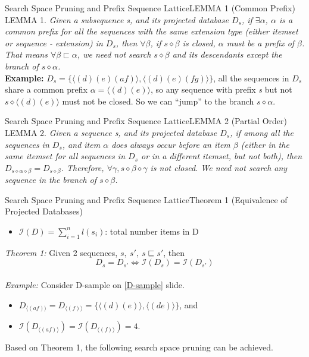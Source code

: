 \documentclass[12pt]{beamer}
\begin{document}
\begin{frame}{Search Space Pruning and Prefix Sequence Lattice}{LEMMA 1 (Common Prefix)}
LEMMA 1. {\it Given a subsequence s, and its projected database $D_s$, if $\exists\alpha$, $\alpha$ is a common prefix for all the sequences with the same extension type (either itemset or sequence - extension) in $D_s$, then $\forall\beta$, if $s \diamond \beta$ is closed, $\alpha$ must be a prefix of $\beta$. That means $\forall\beta \sqsubset \alpha$, we need not search $s \diamond \beta$ and its descendants except the branch of $s \diamond \alpha$.}\\
{\bf Example:} $D_s = \{ \langle (d)(e)(af) \rangle, \langle (d)(e)(fg) \rangle \}$, all the sequences in $D_s$ share a common prefix $\alpha = \langle (d)(e) \rangle$, so any sequence with prefix {\it s} but not $s \diamond \langle (d)(e) \rangle$ must not be closed. So we can ``jump'' to the branch $s \diamond \alpha$.
\end{frame}

\begin{frame}{Search Space Pruning and Prefix Sequence Lattice}{LEMMA 2 (Partial Order)}
LEMMA 2. {\it Given a sequence s, and its projected database $D_s$, if among all the sequences in $D_s$, and item $\alpha$ does always occur before an item $\beta$ (either in the same itemset for all sequences in $D_s$ or in a different itemset, but not both), then $D_{s\diamond\alpha\diamond\beta} = D_{s\diamond\beta}$. Therefore, $\forall\gamma,s\diamond\beta\diamond\gamma$ is not closed. We need not search any sequence in the branch of $s \diamond \beta$.}\\
\end{frame}

\begin{frame}{Search Space Pruning and Prefix Sequence Lattice}{Theorem 1 (Equivalence of Projected Databases)}
\begin{itemize}
	\item $\mathcal{I}(D) = \sum\limits_{i=1}^n l(s_i)$: total number items in D
\end{itemize}
{\it Theorem 1:} Given 2 sequences, $s,~s',~s \sqsubseteq s'$, then $$D_s = D_{s'} \Leftrightarrow \mathcal{I}(D_s) = \mathcal{I}(D_{s'})$$\\
{\it Example:} Consider D-sample on \ref{D-sample} slide.
\begin{itemize}
\item $D_{\langle (af) \rangle} = D_{\langle (f) \rangle} = \{ \langle (d)(e) \rangle,\langle (de) \rangle \}$, and
\item  $\mathcal{I}(D_{ \langle (af) \rangle }) = \mathcal{I}(D_{\langle (f) \rangle}) = 4$.
\end{itemize}
Based on Theorem 1, the following search space pruning can be achieved.
\end{frame}
\end{document}
